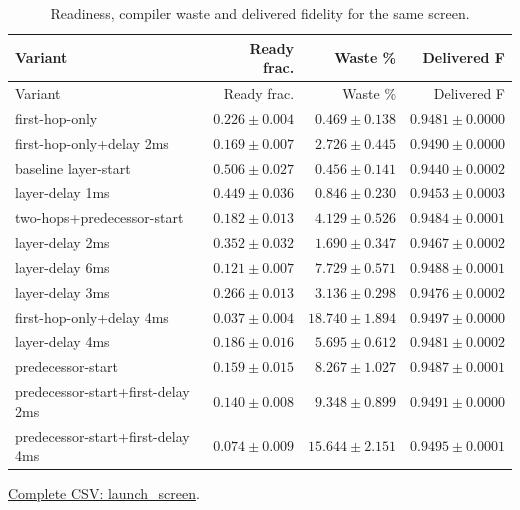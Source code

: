 \clearpage
\begin{center}\small
\begin{longtable}{lrrr}
\caption{Readiness, compiler waste and delivered fidelity for the same screen.}\\
\toprule
Variant & Ready frac. & Waste \% & Delivered F \\
\midrule\endfirsthead
\toprule
Variant & Ready frac. & Waste \% & Delivered F \\
\midrule\endhead
first-hop-only & $0.226 \pm 0.004$ & $0.469 \pm 0.138$ & $0.9481 \pm 0.0000$ \\
first-hop-only+delay 2ms & $0.169 \pm 0.007$ & $2.726 \pm 0.445$ & $0.9490 \pm 0.0000$ \\
baseline layer-start & $0.506 \pm 0.027$ & $0.456 \pm 0.141$ & $0.9440 \pm 0.0002$ \\
layer-delay 1ms & $0.449 \pm 0.036$ & $0.846 \pm 0.230$ & $0.9453 \pm 0.0003$ \\
two-hops+predecessor-start & $0.182 \pm 0.013$ & $4.129 \pm 0.526$ & $0.9484 \pm 0.0001$ \\
layer-delay 2ms & $0.352 \pm 0.032$ & $1.690 \pm 0.347$ & $0.9467 \pm 0.0002$ \\
layer-delay 6ms & $0.121 \pm 0.007$ & $7.729 \pm 0.571$ & $0.9488 \pm 0.0001$ \\
layer-delay 3ms & $0.266 \pm 0.013$ & $3.136 \pm 0.298$ & $0.9476 \pm 0.0002$ \\
first-hop-only+delay 4ms & $0.037 \pm 0.004$ & $18.740 \pm 1.894$ & $0.9497 \pm 0.0000$ \\
layer-delay 4ms & $0.186 \pm 0.016$ & $5.695 \pm 0.612$ & $0.9481 \pm 0.0002$ \\
predecessor-start & $0.159 \pm 0.015$ & $8.267 \pm 1.027$ & $0.9487 \pm 0.0001$ \\
predecessor-start+first-delay 2ms & $0.140 \pm 0.008$ & $9.348 \pm 0.899$ & $0.9491 \pm 0.0000$ \\
predecessor-start+first-delay 4ms & $0.074 \pm 0.009$ & $15.644 \pm 2.151$ & $0.9495 \pm 0.0001$ \\
\bottomrule\end{longtable}\end{center}
{\footnotesize \href{https://github.com/sanjeevkrishnaa/Compiler-Driven-ACE/blob/codex/ace-scheduler-correctness/docs/latex/oct25_pre_golden/data/launch_screen.csv}{Complete CSV: launch\_screen}. }
